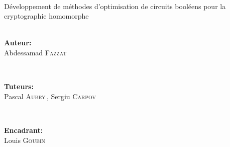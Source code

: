 \documentclass[11pt, headsepline, a4paper, fleqn, oneside]{article}
\begin{document}
\begin{titlepage}
\HRule \\[0.4cm]
{ \huge Développement de méthodes d'optimisation de circuits booléens pour la cryptographie homomorphe}\\[0.1cm] %
\HRule \\[1cm]
 

\begin{minipage}{0.3\textwidth}
\begin{center} 
\textbf{Auteur:}\\
Abdessamad \textsc{Fazzat} 

\end{center}
\end{minipage}
~
\begin{minipage}{0.3\textwidth}
\begin{center} 
\textbf{Tuteurs:} \\
Pascal \textsc{Aubry}\,,
Sergiu \textsc{Carpov}
\end{center}
\end{minipage}
~
\begin{minipage}{0.3\textwidth}
\begin{center} 
\textbf{Encadrant:} \\
Louis \textsc{Goubin} 
\end{center}
\end{minipage}\\[2cm]
\center {\large \today}\\[2cm]



\end{titlepage}
\end{document}
